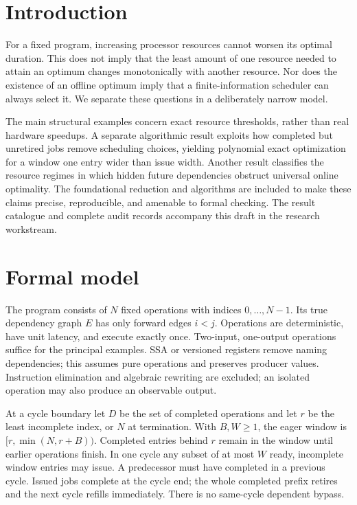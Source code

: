 \documentclass[11pt]{article}
\begin{document}
\section{Introduction}
For a fixed program, increasing processor resources cannot worsen its optimal
duration. This does not imply that the least amount of one resource needed to
attain an optimum changes monotonically with another resource. Nor does the
existence of an offline optimum imply that a finite-information scheduler can
always select it. We separate these questions in a deliberately narrow model.

The main structural examples concern exact resource thresholds, rather than
real hardware speedups. A separate algorithmic result exploits how completed
but unretired jobs remove scheduling choices, yielding polynomial exact
optimization for a window one entry wider than issue width. Another result classifies the resource regimes in
which hidden future dependencies obstruct universal online optimality. The
foundational reduction and algorithms are included to make these claims
precise, reproducible, and amenable to formal checking. The result catalogue
and complete audit records accompany this draft in the research workstream.

\section{Formal model}
The program consists of $N$ fixed operations with indices $0,\ldots,N-1$.
Its true dependency graph $E$ has only forward edges $i<j$. Operations are
deterministic, have unit latency, and execute exactly once. Two-input,
one-output operations suffice for the principal examples. SSA or versioned
registers remove naming dependencies; this assumes pure operations and
preserves producer values. Instruction elimination and algebraic rewriting
are excluded; an isolated operation may also produce an observable output.

At a cycle boundary let $D$ be the set of completed operations and let $r$
be the least incomplete index, or $N$ at termination. With $B,W\ge1$, the
eager window is $[r,\min(N,r+B))$. Completed entries behind $r$ remain in
the window until earlier operations finish. In one cycle any subset of at
most $W$ ready, incomplete window entries may issue. A predecessor must have
completed in a previous cycle. Issued jobs complete at the cycle end; the
whole completed prefix retires and the next cycle refills immediately.
There is no same-cycle dependent bypass.
\end{document}
